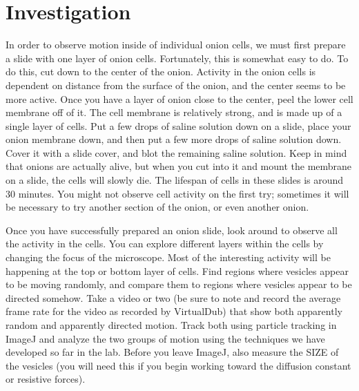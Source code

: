\section*{Investigation}
In order to observe motion inside of individual onion cells, we must first prepare a slide with one layer of onion cells.
Fortunately, this is somewhat easy to do. 
To do this, cut down to the center of the onion. 
Activity in the onion cells is dependent on distance from the surface of the onion, and the center seems to be more active. 
Once you have a layer of onion close to the center, peel the lower cell membrane off of it. 
The cell membrane is relatively strong, and is made up of a single layer of cells. 
Put a few drops of saline solution down on a slide, place your onion membrane down, and then put a few more drops of saline solution down. 
Cover it with a slide cover, and blot the remaining saline solution. 
Keep in mind that onions are actually alive, but when you cut into it and mount the membrane on a slide, the cells will slowly die. 
The lifespan of cells in these slides is around 30 minutes. 
You might not observe cell activity on the first try; sometimes it will be necessary to try another section of the onion, or even another onion. 
\par 
Once you have successfully prepared an onion slide, look around to observe all the activity in the cells. 
You can explore different layers within the cells by changing the focus of the microscope. 
Most of the interesting activity will be happening at the top or bottom layer of cells. 
Find regions where vesicles appear to be moving randomly, and compare them to regions where vesicles appear to be directed somehow. 
Take a video or two (be sure to note and record the average frame rate for the video as recorded by VirtualDub) that show both apparently random and apparently directed motion. 
Track both using particle tracking in ImageJ and analyze the two groups of motion using the techniques we have developed so far in the lab. 
Before you leave ImageJ, also measure the SIZE of the vesicles (you will need this if you begin working toward the diffusion constant or resistive forces).
